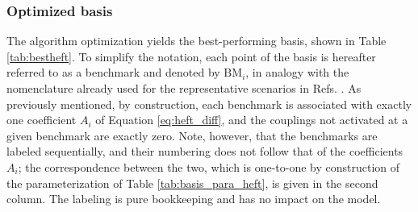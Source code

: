 \subsubsection{Optimized basis}
%
The algorithm optimization yields the best-performing basis, shown in Table \ref{tab:bestheft}. To simplify the notation, each point of the basis is hereafter referred to as a benchmark and denoted by $\mathrm{BM}_i$, in analogy with the nomenclature already used for the representative scenarios in Refs. \cite{Carvalho:2015ttv,Carvalho:2016rys}. As previously mentioned, by construction, each benchmark is associated with exactly one coefficient $A_i$ of Equation \ref{eq:heft_diff}, and the couplings not activated at a given benchmark are exactly zero. Note, however, that the benchmarks are labeled sequentially, and their numbering does not follow that of the coefficients $A_i$; the correspondence between the two, which is one-to-one by construction of the parameterization of Table \ref{tab:basis_para_heft}, is given in the second column. The labeling is pure bookkeeping and has no impact on the model.
%
